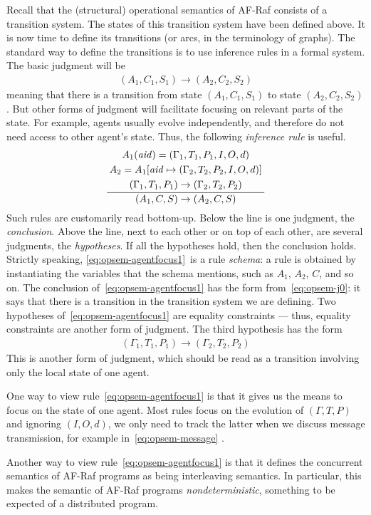 \documentclass[a4paper,12pt,oneside,fleqn]{book} %
\newcommand{\on}[2]{\genfrac{}{}{0pt}{0}{\strut#1}{\strut#2}}
\begin{document}
Recall that the (structural) operational semantics of AF-Raf consists of a
transition system. The states of this transition system have been defined
above. It is now time to define its transitions (or arcs, in the
terminology of graphs). The standard way to define the transitions is to
use inference rules in a formal system. The basic judgment will be
\begin{align}
(A_1,C_1,S_1) \to (A_2, C_2,S_2)
\label{eq:opsem-j0}
\end{align}
meaning that there is a transition from state $(A_1,C_1,S_1)$ to state
$(A_2,C_2,S_2)$. But other forms of judgment will facilitate focusing on
relevant parts of the state. For example, agents usually evolve
independently, and therefore do not need access to other agent's state.
Thus, the following \emph{inference rule} is useful.
\begin{align}
\frac
  {\on{A_1({\it aid})=(\Gamma_1,T_1,P_1,I,O,d)}
  {\on{A_2=A_1[{\it aid}\mapsto(\Gamma_2,T_2,P_2,I,O,d)]}
  {(\Gamma_1,T_1,P_1)\to(\Gamma_2,T_2,P_2)}}}
  {(A_1,C,S)\to(A_2,C,S)}
\label{eq:opsem-agentfocus1}
\end{align}
Such rules are customarily read bottom-up. Below the line is one judgment,
the \emph{conclusion}. Above the line, next to each other or on top of each
other, are several judgments, the \emph{hypotheses}. If all the hypotheses
hold, then the conclusion holds. Strictly speaking,
\eqref{eq:opsem-agentfocus1}~is a rule \emph{schema}: a rule is obtained by
instantiating the variables that the schema mentions, such as $A_1$, $A_2$,
$C$, and so on. The conclusion of~\eqref{eq:opsem-agentfocus1} has the form
from~\eqref{eq:opsem-j0}: it says that there is a transition in the
transition system we are defining. Two hypotheses
of~\eqref{eq:opsem-agentfocus1} are equality constraints --- thus, equality
constraints are another form of judgment. The third hypothesis has the form
\begin{align}
(\Gamma_1,T_1,P_1)\to(\Gamma_2,T_2,P_2)
\end{align}
This is another form of judgment, which should be read as a transition
involving only the local state of one agent. 

One way to view rule~\eqref{eq:opsem-agentfocus1} is that it gives us the
means to focus on the state of one agent. Most rules focus on the evolution
of $(\Gamma,T,P)$ and ignoring $(I,O,d)$, we only need to track the latter
when we discuss message transmission, for example in~\eqref{eq:opsem-message} .

Another way to view rule~\eqref{eq:opsem-agentfocus1} is that it defines the
concurrent semantics of AF-Raf programs as being interleaving semantics. In
particular, this makes the semantic of AF-Raf programs
\emph{nondeterministic}, something to be expected of a distributed program.
\end{document}
